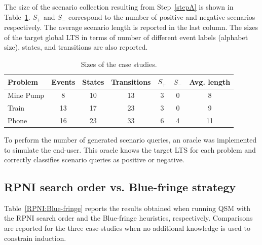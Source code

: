 The size of the scenario collection resulting from Step~\ref{stepA} is shown in Table~\ref{CaseStudies}. $S_+$ and $S_-$ correspond to the number of positive and negative scenarios respectively. The average scenario length is reported in the last column. The sizes of the target global LTS in terms of number of different event labels (alphabet size), states, and transitions are also reported. 

\begin{table}[H]
\centering
\begin{tabular}{|l||c|c|c||c|c|c|}\hline
Problem  & Events & States & Transitions & $S_+$ & $S_-$ & Avg. length\\\hline\hline
Mine Pump& 8      & 10     & 13          & 3     & 0     & 8\\\hline
Train    & 13     & 17     & 23          & 3     & 0     & 9\\\hline
Phone    & 16     & 23     & 33          & 6     & 4     & 11\\\hline
\end{tabular}
\caption{Sizes of the case studies.\label{CaseStudies}}
\end{table} 

To perform the number of generated scenario queries, an oracle was implemented to simulate the end-user. This oracle knows the target LTS for each problem and correctly classifies scenario queries as positive or negative.


\subsection{RPNI search order vs. Blue-fringe strategy}

Table~\ref{RPNI:Blue-fringe} reports the results obtained when running QSM with the RPNI search order and the Blue-fringe heuristics, respectively. Comparisons are reported for the three case-studies when no additional knowledge is used to constrain induction. 

